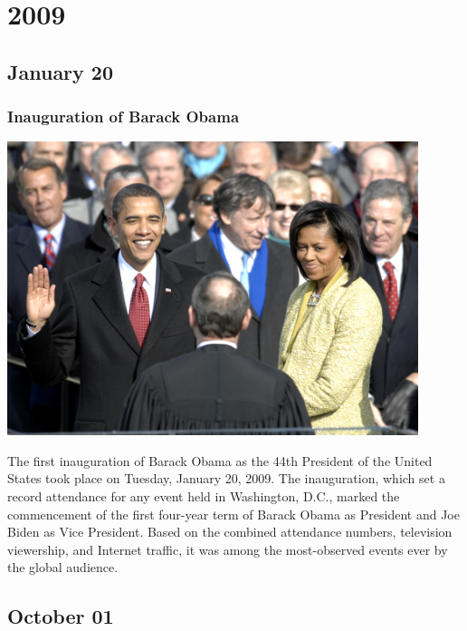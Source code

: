 \documentclass[11pt]{report}
\begin{document}
\chapter{2009}
\section{January 20}
\subsection{Inauguration of Barack Obama}
\vspace{2mm}\begin{center}\includegraphics[width=12cm]{./img/obamaInaug.jpg}\end{center}
The first inauguration of Barack Obama as the 44th President of the United States took place on Tuesday, January 20, 2009. The inauguration, which set a record attendance for any event held in Washington, D.C., marked the commencement of the first four-year term of Barack Obama as President and Joe Biden as Vice President. Based on the combined attendance numbers, television viewership, and Internet traffic, it was among the most-observed events ever by the global audience.

\section{October 01}
\end{document}
